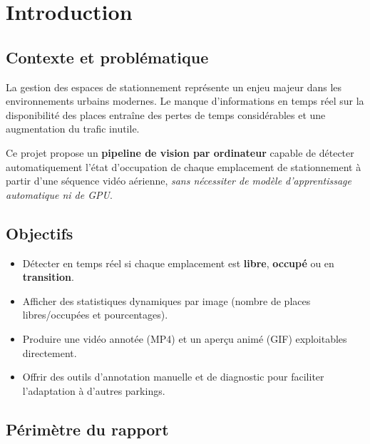 \documentclass[12pt,a4paper]{report}
\begin{document}
\tableofcontents
\newpage

\chapter{Introduction}

\section{Contexte et problématique}

La gestion des espaces de stationnement représente un enjeu majeur dans les environnements urbains modernes. Le manque d'informations en temps réel sur la disponibilité des places entraîne des pertes de temps considérables et une augmentation du trafic inutile.

Ce projet propose un \textbf{pipeline de vision par ordinateur} capable de détecter automatiquement l'état d'occupation de chaque emplacement de stationnement à partir d'une séquence vidéo aérienne, \textit{sans nécessiter de modèle d'apprentissage automatique ni de GPU}.

\section{Objectifs}

\begin{itemize}
  \item Détecter en temps réel si chaque emplacement est \textcolor{mygreen}{\textbf{libre}}, \textcolor{myred}{\textbf{occupé}} ou en \textcolor{myyellow}{\textbf{transition}}.
  \item Afficher des statistiques dynamiques par image (nombre de places libres/occupées et pourcentages).
  \item Produire une vidéo annotée (MP4) et un aperçu animé (GIF) exploitables directement.
  \item Offrir des outils d'annotation manuelle et de diagnostic pour faciliter l'adaptation à d'autres parkings.
\end{itemize}

\section{Périmètre du rapport}
\end{document}
